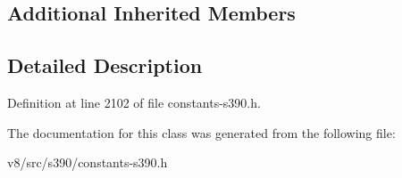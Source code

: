 \subsection*{Additional Inherited Members}


\subsection{Detailed Description}


Definition at line 2102 of file constants-\/s390.\+h.



The documentation for this class was generated from the following file\+:\begin{DoxyCompactItemize}
\item 
v8/src/s390/constants-\/s390.\+h\end{DoxyCompactItemize}
